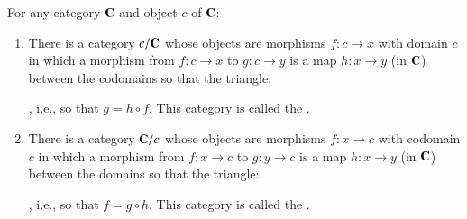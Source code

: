 \documentclass[12pt, a4paper, oneside, openright, titlepage]{book}
\begin{document}
\begin{defn}
    For any category $\normalfont\textbf{C}$ and object $c$ of $\normalfont\textbf{C}$: \begin{enumerate}
        \item There is a category $c/\normalfont\textbf{C}$ whose objects are morphisms $f:c\rightarrow x$ with domain $c$ in which a morphism from $f:c\rightarrow x$ to $g:c\rightarrow y$ is a map $h:x\rightarrow y$ (in $\normalfont\textbf{C}$) between the codomains so that the triangle: 
            \begin{center}
            \end{center} 
            , i.e., so that $g= h\circ f$. This category is called the .
        \item There is a category $\normalfont\textbf{C}/c$ whose objects are morphisms $f:x\rightarrow c$ with codomain $c$ in which a morphism from $f:x\rightarrow c$ to $g:y\rightarrow c$ is a map $h:x\rightarrow y$ (in $\normalfont\textbf{C}$) between the domains so that the triangle: 
            \begin{center}
            \end{center} 
            , i.e., so that $f= g\circ h$. This category is called the .
    \end{enumerate}
\end{defn}
\end{document}
